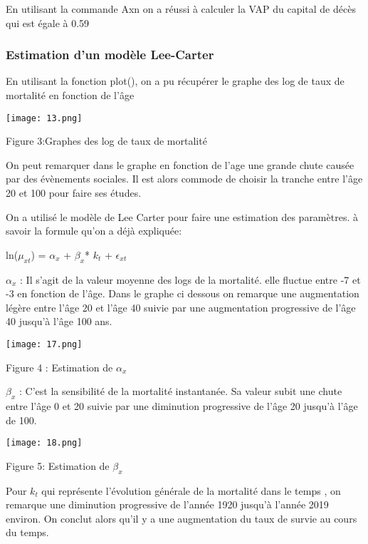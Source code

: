 \documentclass{article}
\begin{document}
{{\large En utilisant la commande Axn on a réussi à calculer la VAP du capital de décès qui est égale à 0.59}
\subsubsection{Estimation  d'un modèle  Lee-Carter}
{\large En utilisant la fonction plot(), on a pu récupérer le graphe des log de taux de mortalité en fonction de l'âge}

\texttt{[image: 13.png]}

\begin{center}
    {\large Figure 3:Graphes des log de taux de mortalité}
\end{center}

{\large On peut remarquer dans le graphe en fonction de l'age une grande chute causée par des évènements sociales. Il est alors commode de choisir la tranche entre l'âge 20 et 100 pour faire ses études. }

{\large On a utilisé le modèle de Lee Carter pour faire une estimation des paramètres. à savoir la formule qu'on a déjà expliquée:}

\begin{center}
    {\large ln($\mu_{xt} $) = $\alpha_{x}$ + $\beta_{x}$* $k_{t} $ + $\epsilon_{xt} $}
\end{center}

{\large $\alpha_{x}$ : Il s'agit de la valeur moyenne des logs de la mortalité. elle fluctue entre -7 et -3 en fonction de l'âge. Dans le graphe ci dessous on remarque une augmentation légère entre l'âge 20 et l'âge 40 suivie par une augmentation progressive de l'âge 40 jusqu'à l'âge 100 ans.  }

\texttt{[image: 17.png]}
\begin{center}
    {\large Figure 4 : Estimation de $\alpha_{x}$ }
\end{center}

{\large $\beta_{x}$ : C'est la sensibilité de la mortalité instantanée. Sa valeur subit une chute entre l'âge 0 et 20 suivie par une diminution progressive de l'âge 20 jusqu'à l'âge de 100.}

\texttt{[image: 18.png]}
\begin{center}
    {\large Figure 5: Estimation de $\beta_{x}$ }
\end{center}

{\large  Pour  $k_{t}$ qui représente l'évolution générale de la mortalité dans le temps , on remarque une diminution progressive de l'année 1920 jusqu'à l'année 2019 environ. On conclut alors qu'il y a une augmentation du taux de survie au cours du temps.}

}
\end{document}
